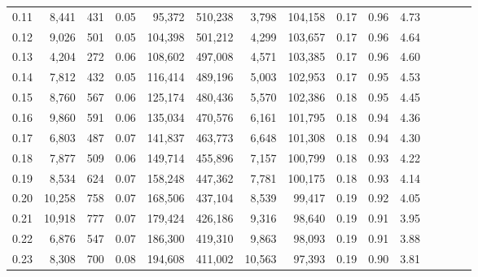 \begin{tabular}{rrrcrrrrrrrrrrr}
0.11 &   8,441 &    431 &                                       0.05 &   95,372 &  510,238 &    3,798 &  104,158 &  0.17 &  0.96 &                         4.73 \\
0.12 &   9,026 &    501 &                                       0.05 &  104,398 &  501,212 &    4,299 &  103,657 &  0.17 &  0.96 &                         4.64 \\
0.13 &   4,204 &    272 &                                       0.06 &  108,602 &  497,008 &    4,571 &  103,385 &  0.17 &  0.96 &                         4.60 \\
0.14 &   7,812 &    432 &                                       0.05 &  116,414 &  489,196 &    5,003 &  102,953 &  0.17 &  0.95 &                         4.53 \\
0.15 &   8,760 &    567 &                                       0.06 &  125,174 &  480,436 &    5,570 &  102,386 &  0.18 &  0.95 &                         4.45 \\
0.16 &   9,860 &    591 &                                       0.06 &  135,034 &  470,576 &    6,161 &  101,795 &  0.18 &  0.94 &                         4.36 \\
0.17 &   6,803 &    487 &                                       0.07 &  141,837 &  463,773 &    6,648 &  101,308 &  0.18 &  0.94 &                         4.30 \\
0.18 &   7,877 &    509 &                                       0.06 &  149,714 &  455,896 &    7,157 &  100,799 &  0.18 &  0.93 &                         4.22 \\
0.19 &   8,534 &    624 &                                       0.07 &  158,248 &  447,362 &    7,781 &  100,175 &  0.18 &  0.93 &                         4.14 \\
0.20 &  10,258 &    758 &                                       0.07 &  168,506 &  437,104 &    8,539 &   99,417 &  0.19 &  0.92 &                         4.05 \\
0.21 &  10,918 &    777 &                                       0.07 &  179,424 &  426,186 &    9,316 &   98,640 &  0.19 &  0.91 &                         3.95 \\
0.22 &   6,876 &    547 &                                       0.07 &  186,300 &  419,310 &    9,863 &   98,093 &  0.19 &  0.91 &                         3.88 \\
0.23 &   8,308 &    700 &                                       0.08 &  194,608 &  411,002 &   10,563 &   97,393 &  0.19 &  0.90 &                         3.81 \\

\end{tabular}
